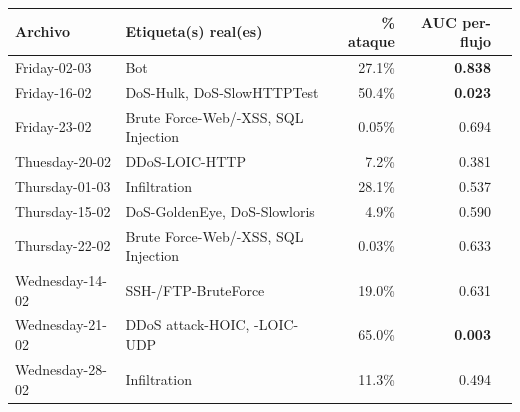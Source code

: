\documentclass[11pt]{article}
\begin{document}
\begin{center}
\begin{longtable}{@{}lp{4.4cm}rrr@{}}
\toprule
\textbf{Archivo} & \textbf{Etiqueta(s) real(es)} & \textbf{\% ataque} & \textbf{AUC per-flujo} & \\
\midrule
\endhead
Friday-02-03 & Bot & 27.1\% & \textbf{0.838} & \\
Friday-16-02 & DoS-Hulk, DoS-SlowHTTPTest & 50.4\% & \textbf{0.023} & \\
Friday-23-02 & Brute Force-Web/-XSS, SQL Injection & 0.05\% & 0.694 & \\
Thuesday-20-02 & DDoS-LOIC-HTTP & 7.2\% & 0.381 & \\
Thursday-01-03 & Infiltration & 28.1\% & 0.537 & \\
Thursday-15-02 & DoS-GoldenEye, DoS-Slowloris & 4.9\% & 0.590 & \\
Thursday-22-02 & Brute Force-Web/-XSS, SQL Injection & 0.03\% & 0.633 & \\
Wednesday-14-02 & SSH-/FTP-BruteForce & 19.0\% & 0.631 & \\
Wednesday-21-02 & DDoS attack-HOIC, -LOIC-UDP & 65.0\% & \textbf{0.003} & \\
Wednesday-28-02 & Infiltration & 11.3\% & 0.494 & \\
\bottomrule
\end{longtable}
\end{center}
\end{document}
